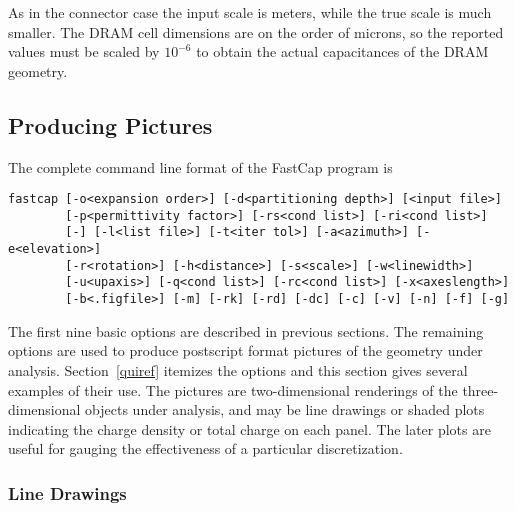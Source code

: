 
As in the connector case the input scale is meters, while the true
scale is much smaller.  The DRAM cell dimensions are on the order
of microns, so the reported values must be scaled by $10^{-6}$ to
obtain the actual capacitances of the DRAM geometry.

\subsection{Producing Pictures}
\label{genpic}

The complete command line format of the FastCap program is
\begin{verbatim}
fastcap [-o<expansion order>] [-d<partitioning depth>] [<input file>]
        [-p<permittivity factor>] [-rs<cond list>] [-ri<cond list>]
        [-] [-l<list file>] [-t<iter tol>] [-a<azimuth>] [-e<elevation>]
        [-r<rotation>] [-h<distance>] [-s<scale>] [-w<linewidth>]
        [-u<upaxis>] [-q<cond list>] [-rc<cond list>] [-x<axeslength>]
        [-b<.figfile>] [-m] [-rk] [-rd] [-dc] [-c] [-v] [-n] [-f] [-g]
\end{verbatim}
The first nine basic options 
are described in previous sections. The remaining options are used
to produce postscript format pictures of the geometry under analysis.
Section~\ref{quiref} itemizes the options and this section gives
several examples of their use.
The pictures are two-dimensional renderings of the three-dimensional
objects under analysis, and may be line drawings or shaded plots
indicating the charge density or total charge on each panel.  The
later plots are useful for gauging the effectiveness of a particular
discretization. 

\subsubsection{Line Drawings}

